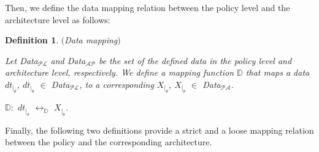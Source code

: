 \documentclass[a4paper]{article}
\newtheorem{ttd}{Definition}
\begin{document}
Then, we define the data mapping relation between the policy level and the architecture level as follows: 

\begin{ttd} $($Data mapping$)$
    
\noindent Let Data$_{\mathcal{P}\mathcal{L}}$ and Data$_{\mathcal{A}\mathcal{P}}$ be the set of the defined data in the policy level and architecture level, respectively. 
We define a mapping function $\mathbb{D}$ that maps a data $dt_{|_{\theta}}$, $dt_{|_{\theta}}$ $\in$ \textit{Data}$_{\mathcal{P}\mathcal{L}}$, to a corresponding $X_{|_{\theta}}$, $X_{|_{\theta}}$ $\in$ \textit{Data}$_{\mathcal{P}\mathcal{A}}$.       

\begin{center}
$\mathbb{D}$$:$ $dt_{|_{\theta}}$  $\leftrightarrow_{\mathbb{D}}$ $X_{|_{\theta}}$.

\end{center}    
\end{ttd} 

Finally, the following two definitions provide a strict and a loose mapping relation between the policy and the corresponding architecture.
\end{document}
